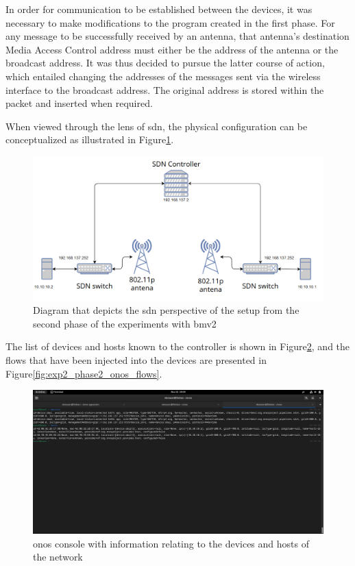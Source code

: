 In order for communication to be established between the devices, it was necessary to make modifications to the program created in the first phase. For any message to be successfully received by an antenna, that antenna's destination Media Access Control address must either be the address of the antenna or the broadcast address. It was thus decided to pursue the latter course of action, which entailed changing the addresses of the messages sent via the wireless interface to the broadcast address. The original address is stored within the packet and inserted when required.

When viewed through the lens of \gls{sdn}, the physical configuration can be conceptualized as illustrated in Figure\ref{fig:exp2_phase2_sdn_diagram}.

\begin{figure}
	\centering
	\includegraphics[width=\textwidth]{Chapters/Figures/tests/bmv2_phase_2/sdn_diagram.PNG}
	\caption{Diagram that depicts the \gls{sdn} perspective of the setup from the second phase of the experiments with \gls{bmv2}}
	\label{fig:exp2_phase2_sdn_diagram}
\end{figure}


The list of devices and hosts known to the controller is shown in Figure\ref{fig:exp2_phase2_onos}, and the flows that have been injected into the devices are presented in Figure\ref{fig:exp2_phase2_onos_flows}.

\begin{figure}
	\centering
	\includegraphics[width=\textwidth]{Chapters/Figures/tests/bmv2_phase_2/onos_topology.PNG}
	\caption{\gls{onos} console with information relating to the devices and hosts of the network}
	\label{fig:exp2_phase2_onos}
\end{figure}

